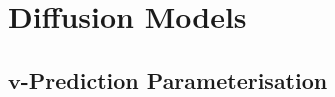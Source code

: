 \documentclass[ oneside,%
                    author={George Herbert},
                    degree={MSci},
                     title={Video Diffusion Models for Climate Simulations},
                  subtitle={}]{dissertation}
\begin{document}
\backmatter





\appendix

\chapter{Diffusion Models}
\label{appx:diffusion}

\section{$\mathbf{v}$-Prediction Parameterisation}
\label{appx:diffusion_v_prediction_parameterisation}
\end{document}
